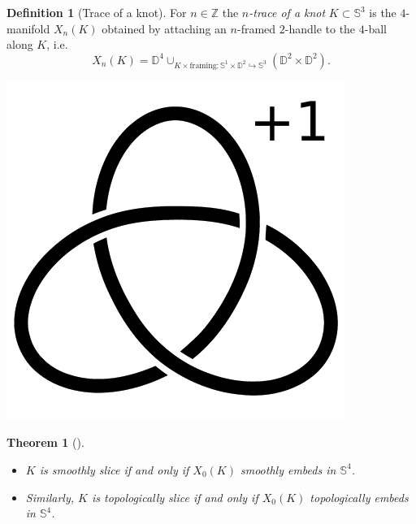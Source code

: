 \documentclass[nobib]{tufte-book} %
\newtheorem{theorem}{Theorem}
\theoremstyle{definition}
\newtheorem{definition}{Definition}
\theoremstyle{remark}
\newcommand{\sphere}[1]{\mathbb{S}^{#1}}
\newcommand{\disk}[1]{\mathbb{D}^{#1}}
\newcommand{\Z}{\mathbb{Z}}
\begin{document}
\begin{definition}[Trace of a knot]
	For $n \in \Z$ the \textit{$n$-trace of a knot} 
	$K \subset \sphere{3}$
	is the $4$-manifold $X_{n}(K)$ obtained by attaching an $n$-framed $2$-handle to the $4$-ball along $K$,
	i.e. 
	\begin{equation*}
	X_{n}(K) = \disk{4} \cup_{K \times \textrm{framing} \colon \sphere{1} \times \disk{2} \hookrightarrow \sphere{3}} (\disk{2} \times \disk{2}).
	\end{equation*}
	
	\begin{marginfigure}
		\begin{center}
			\includegraphics[width=0.5\linewidth]{./pictures/right_handed_trefoil_+1_surgery.pdf}
		\end{center}
		\caption{
			A Kirby diagram for $X_{n}(K)$ is given just by the knot $K$ with the framing $n$ written next to it.
			For example, here is a Kirby diagram representing the $1$-trace
			$X_1(\textrm{right handed trefoil})$.
			The boundary of this $4$-manifold is the $+1$-surgery
			$\sphere{3}_{+1}(\textrm{right handed trefoil})$,
			a possible description of the Poincar\'e homology sphere.}
		\label{fig:right_handed_trefoil_+1_surgery}
	\end{marginfigure}
\end{definition}

\begin{theorem}[{\citep[Thm. 1.8]{miller2018knot}}]
	\begin{itemize}
		\item $K$ is smoothly slice if and only if $X_{0}(K)$ smoothly embeds in $\sphere{4}$.
		\item Similarly, $K$ is topologically slice if and only if $X_{0}(K)$ topologically
		embeds in $\sphere{4}$.
	\end{itemize}
\end{theorem}
\end{document}
